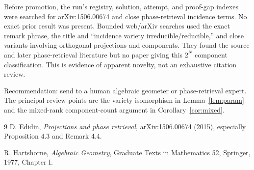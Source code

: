 \documentclass[11pt]{article}
\begin{document}
Before promotion, the run's registry, solution, attempt, and proof-gap indexes
were searched for arXiv:1506.00674 and close phase-retrieval incidence terms.
No exact prior result was present.  Bounded web/arXiv searches used the exact
remark phrase, the title and ``incidence variety irreducible/reducible,'' and
close variants involving orthogonal projections and components.  They found
the source and later phase-retrieval literature but no paper giving this
$2^N$ component classification.  This is evidence of apparent novelty, not
an exhaustive citation review.

Recommendation: send to a human algebraic geometer or phase-retrieval expert.
The principal review points are the variety isomorphism in
Lemma~\ref{lem:param} and the mixed-rank component-count argument in
Corollary~\ref{cor:mixed}.

\begin{thebibliography}{9}
D. Edidin,
\emph{Projections and phase retrieval},
arXiv:1506.00674 (2015), especially Proposition 4.3 and Remark 4.4.

R. Hartshorne,
\emph{Algebraic Geometry},
Graduate Texts in Mathematics 52, Springer, 1977, Chapter I.
\end{thebibliography}
\end{document}
